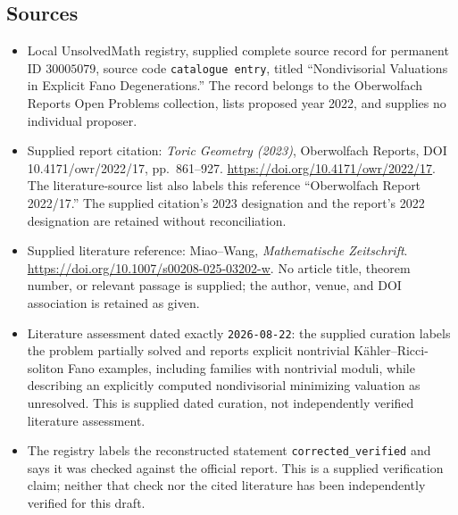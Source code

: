 \documentclass[11pt]{article}
\begin{document}
\subsection{Sources}
\begin{itemize}
\item Local UnsolvedMath registry, supplied complete source record for permanent ID \(30005079\), source code \texttt{catalogue entry}, titled ``Nondivisorial Valuations in Explicit Fano Degenerations.'' The record belongs to the Oberwolfach Reports Open Problems collection, lists proposed year 2022, and supplies no individual proposer.
\item Supplied report citation: \emph{Toric Geometry (2023)}, Oberwolfach Reports, DOI 10.4171/owr/2022/17, pp.\ 861--927. \url{https://doi.org/10.4171/owr/2022/17}. The literature-source list also labels this reference ``Oberwolfach Report 2022/17.'' The supplied citation's 2023 designation and the report's 2022 designation are retained without reconciliation.
\item Supplied literature reference: Miao--Wang, \emph{Mathematische Zeitschrift}. \url{https://doi.org/10.1007/s00208-025-03202-w}. No article title, theorem number, or relevant passage is supplied; the author, venue, and DOI association is retained as given.
\item Literature assessment dated exactly \texttt{2026-08-22}: the supplied curation labels the problem partially solved and reports explicit nontrivial K\"ahler--Ricci-soliton Fano examples, including families with nontrivial moduli, while describing an explicitly computed nondivisorial minimizing valuation as unresolved. This is supplied dated curation, not independently verified literature assessment.
\item The registry labels the reconstructed statement \texttt{corrected\_verified} and says it was checked against the official report. This is a supplied verification claim; neither that check nor the cited literature has been independently verified for this draft.
\end{itemize}
\end{document}
